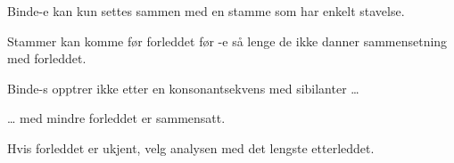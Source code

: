 \begin{enum}
	\item Binde-e kan kun settes sammen med en stamme som har enkelt stavelse.
		
		\newline
		\newline
	
	\item Stammer kan komme før forleddet før -e så lenge de ikke danner sammensetning med forleddet.
		
		\newline
	
	\item Binde-s opptrer ikke etter en konsonantsekvens med sibilanter … 
		
		\newline
	
	\item … med mindre forleddet er sammensatt.
		
		\newline
	
	\item Hvis forleddet er ukjent, velg analysen med det lengste etterleddet.
		
		\newline
	
\end{enum}

